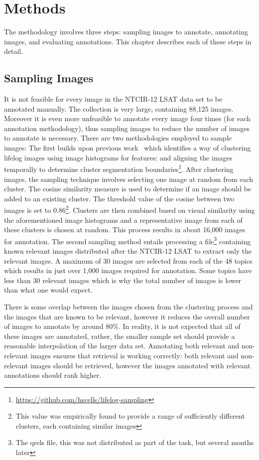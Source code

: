 \chapter{Methods}\label{chapter:methodology}

The methodology involves three steps: sampling images to annotate, annotating images, and evaluating annotations. This chapter describes each of these steps in detail.

\section{Sampling Images}

It is not feasible for every image in the NTCIR-12 LSAT data set to be annotated manually. The collection is very large, containing 88,125 images. Moreover it is even more unfeasible to annotate every image four times (for each annotation methodology), thus sampling images to reduce the number of images to annotate is necessary. There are two methodologies employed to sample images: The first builds upon previous work~\cite{scells2016qut} which identifies a way of clustering lifelog images using image histograms for features; and aligning the images temporally to determine cluster segmentation boundaries\footnote{\url{https://github.com/hscells/lifelog-sampling}}. After clustering images, the sampling technique involves selecting one image at random from each cluster. The cosine similarity measure is used to determine if an image should be added to an existing cluster. The threshold value of the cosine between two images is set to 0.86\footnote{This value was empirically found to provide a range of sufficiently different clusters, each containing similar images}. Clusters are then combined based on visual similarity using the aforementioned image histograms and a representative image from each of these clusters is chosen at random. This process results in about 16,000 images for annotation. The second sampling method entails processing a file\footnote{The qrels file, this was not distributed as part of the task, but several months later} containing known relevant images distributed after the NTCIR-12 LSAT to extract only the relevant images. A maximum of 30 images are selected from each of the 48 topics which results in just over 1,000 images required for annotation. Some topics have less than 30 relevant images which is why the total number of images is lower than what one would expect.

There is some overlap between the images chosen from the clustering process and the images that are known to be relevant, however it reduces the overall number of images to annotate by around 80\%. In reality, it is not expected that all of these images are annotated, rather, the smaller sample set should provide a reasonable interpolation of the larger data set. Annotating both relevant and non-relevant images ensures that retrieval is working correctly: both relevant and non-relevant images should be retrieved, however the images annotated with relevant annotations should rank higher.

